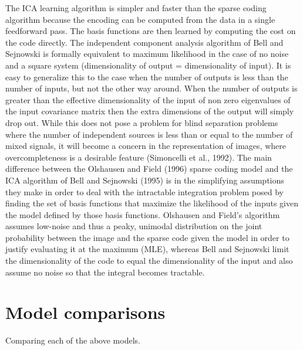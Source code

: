 The ICA learning algorithm is simpler and faster than the sparse coding algorithm because the encoding can be computed from the data in a single feedforward pass. The basis functions are then learned by computing the cost on the code directly. The independent component analysis algorithm of Bell and Sejnowski is formally equivalent to maximum likelihood in the case of no noise and a square system (dimensionality of output = dimensionality of input). It is easy to generalize this to the case when the number of outputs is less than the number of inputs, but not the other way around. When the number of outputs is greater than the effective dimensionality of the input of non zero eigenvalues of the input covariance matrix then the extra dimensions of the output will simply drop out. While this does not pose a problem for blind separation problems where the number of independent sources is less than or equal to the number of mixed signals, it will become a concern in the representation of images, where overcompleteness is a desirable feature (Simoncelli et al., 1992). The main difference between the Olshausen and Field (1996) sparse coding model and the ICA algorithm of Bell and Sejnowski (1995) is in the simplifying assumptions they make in order to deal with the intractable integration problem posed by finding the set of basis functions that maximize the likelihood of the inputs given the model defined by those basis functions. Olshausen and Field’s algorithm assumes low-noise and thus a peaky, unimodal distribution on the joint probability between the image and the sparse code given the model in order to justify evaluating it at the maximum (MLE), whereas Bell and Sejnowski limit the dimensionality of the code to equal the dimensionality of the input and also assume no noise so that the integral becomes tractable.


\section{Model comparisons}
Comparing each of the above models.